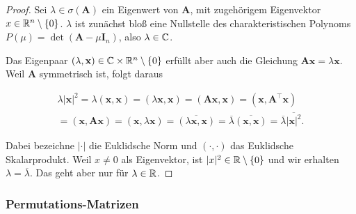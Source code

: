             \begin{proof}

                Sei $\lambda \in \sigma(\mathbf A)$ ein Eigenwert von $\mathbf A$, mit zugehörigem Eigenvektor $x \in \mathbb R^n \setminus {\left \{ 0 \right \}}$.
                $\lambda$ ist zunächst bloß eine Nullstelle des charakteristischen Polynoms $P(\mu) = \det(\mathbf A - \mu \mathbf I_n)$, also $\lambda \in \mathbb C$.

                Das Eigenpaar $(\lambda, \mathbf x) \in \mathbb C \times \mathbb R^n \setminus {\left \{ 0 \right \}}$ erfüllt aber auch die Gleichung $\mathbf A \mathbf x = \lambda \mathbf x$.
                Weil $\mathbf A$ symmetrisch ist, folgt daraus

                \begin{multline*}
                    \lambda |\mathbf x|^2
                    =
                    \lambda (\mathbf x, \mathbf x)
                    =
                    (\lambda \mathbf x, \mathbf x)
                    =
                    (\mathbf A \mathbf x, \mathbf x)
                    =
                    (\mathbf x, \mathbf A^\top \mathbf x) \\
                    =
                    (\mathbf x, \mathbf A \mathbf x)
                    =
                    (\mathbf x, \lambda \mathbf x)
                    =
                    \overline{(\lambda \mathbf x, \mathbf x)}
                    =
                    \overline \lambda \overline{(\mathbf x, \mathbf x)}
                    =
                    \overline \lambda \overline{|\mathbf x|^2}.
                \end{multline*}

                Dabei bezeichne $|\cdot|$ die Euklidsche Norm und $(\cdot, \cdot)$ das Euklidsche Skalarprodukt.
                Weil $x \neq 0$ als Eigenvektor, ist $|x|^2 \in \mathbb R \setminus {\left \{ 0 \right \}}$ und wir erhalten $\lambda = \overline \lambda$.
                Das geht aber nur für $\lambda \in \mathbb R$.

            \end{proof}


            \subsubsection{Permutations-Matrizen}

